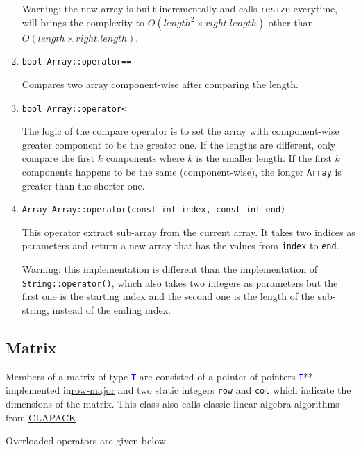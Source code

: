 \documentclass[11pt,a4paper]{article}
\newcommand{\ttype}[1]{\textcolor{blue}{\texttt{#1}}}
\theoremstyle{definition}
\theoremstyle{definition}
\numberwithin{equation}{section}
\begin{document}
\begin{enumerate}
		Warning: the new array is built incrementally and calls \texttt{resize} everytime, will brings the complexity to $O(length^2\times right.length)$ other than $O(length\times right.length)$.
		
		\item \texttt{bool Array::operator==}
		
		Compares two array component-wise after comparing the length.
		
		\item \texttt{bool Array::operator<}
		
		The logic of the compare operator is to set the array with component-wise greater component to be the greater one. If the lengths are different, only compare the first $k$ components where $k$ is the smaller length. If the first $k$ components happens to be the same (component-wise), the longer \texttt{Array} is greater than the shorter one. 
		
		\item \texttt{Array Array::operator(const int index, const int end)}
		
		This operator extract sub-array from the current array. It takes two indices as parameters and return a new array that has the values from \texttt{index} to \texttt{end}.
		
		Warning: this implementation is different than the implementation of \texttt{String::operator()}, which also takes two integers as parameters but the first one is the starting index and the second one is the length of the sub-string, instead of the ending index.
		
	\end{enumerate}
	
	\subsection{Matrix}
	
	Members of a matrix of type \ttype{T} are consisted of a pointer of pointers \ttype{T}** implemented in\href{https://en.wikipedia.org/wiki/Row-_and_column-major_order}{row-major} and two static integers \texttt{row} and \texttt{col} which indicate the dimensions of the matrix. This class also calls classic linear algebra algorithms from \href{https://www.netlib.org/clapack/}{CLAPACK}. 
	
	Overloaded operators are given below.
	
\end{document}
